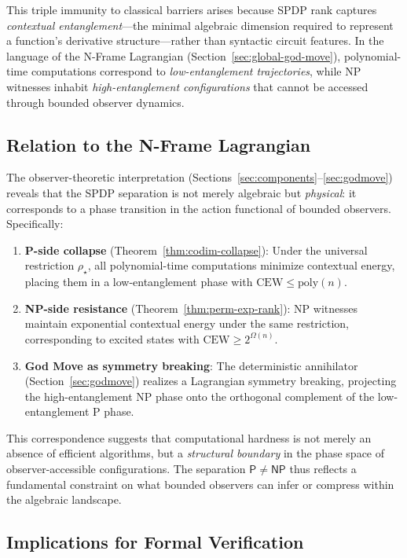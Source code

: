\documentclass[12pt]{article}
\theoremstyle{definition}
\theoremstyle{definition}
\theoremstyle{remark}
\theoremstyle{remark}
\begin{document}
This triple immunity to classical barriers arises because SPDP rank captures \emph{contextual entanglement}---the minimal algebraic dimension required to represent a function's derivative structure---rather than syntactic circuit features. In the language of the N-Frame Lagrangian (Section~\ref{sec:global-god-move}), polynomial-time computations correspond to \emph{low-entanglement trajectories}, while NP witnesses inhabit \emph{high-entanglement configurations} that cannot be accessed through bounded observer dynamics.

\subsection{Relation to the N-Frame Lagrangian}

The observer-theoretic interpretation (Sections~\ref{sec:components}--\ref{sec:godmove}) reveals that the SPDP separation is not merely algebraic but \emph{physical}: it corresponds to a phase transition in the action functional of bounded observers. Specifically:
\begin{enumerate}
\item \textbf{P-side collapse} (Theorem~\ref{thm:codim-collapse}): Under the universal restriction $\rho_\star$, all polynomial-time computations minimize contextual energy, placing them in a low-entanglement phase with $\mathrm{CEW} \leq \mathrm{poly}(n)$.

\item \textbf{NP-side resistance} (Theorem~\ref{thm:perm-exp-rank}): NP witnesses maintain exponential contextual energy under the same restriction, corresponding to excited states with $\mathrm{CEW} \geq 2^{\Omega(n)}$.

\item \textbf{God Move as symmetry breaking}: The deterministic annihilator (Section~\ref{sec:godmove}) realizes a Lagrangian symmetry breaking, projecting the high-entanglement NP phase onto the orthogonal complement of the low-entanglement P phase.
\end{enumerate}

This correspondence suggests that computational hardness is not merely an absence of efficient algorithms, but a \emph{structural boundary} in the phase space of observer-accessible configurations. The separation $\mathsf{P} \neq \mathsf{NP}$ thus reflects a fundamental constraint on what bounded observers can infer or compress within the algebraic landscape.

\subsection{Implications for Formal Verification}
\end{document}
